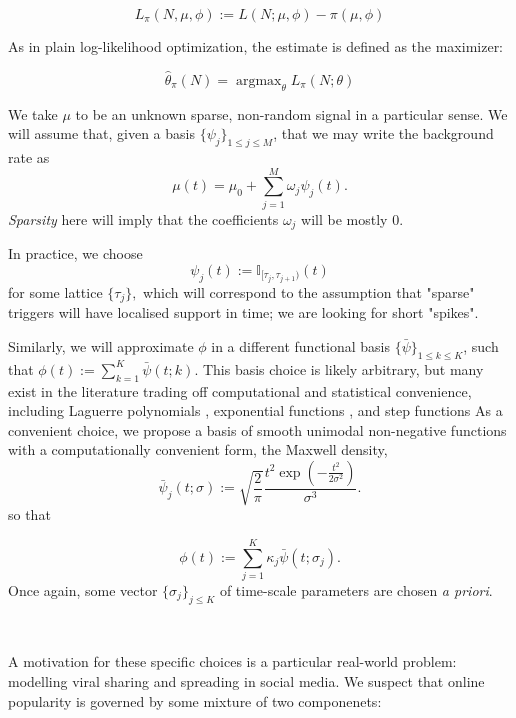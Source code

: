 \documentclass[11pt]{article}
\begin{document}
\[L_\pi(N, \mu, \phi):= L(N; \mu, \phi)- \pi(\mu, \phi)\]

As in plain log-likelihood optimization, the estimate is defined as the
maximizer:

\[\hat{\theta}_\pi(N) = \operatorname{argmax}_\theta L_\pi(N;\theta)\]

    We take \(\mu\) to be an unknown sparse, non-random signal in a
particular sense. We will assume that, given a basis
\(\{\psi_j \}_{1\leq j\leq M}\), that we may write the background rate
as \[\mu(t) = \mu_0 + \sum_{j=1}^M  \omega_j \psi_j(t).\]
\emph{Sparsity} here will imply that the coefficients \(\omega_j\) will
be mostly 0.

In practice, we choose
\[\psi_j(t) := \mathbb{I}_{[\tau_{j},\tau_{j+1})}(t)\] for some lattice
\(\{\tau_j\},\) which will correspond to the assumption that "sparse"
triggers will have localised support in time; we are looking for short
"spikes".

Similarly, we will approximate \(\phi\) in a different functional basis
\(\{\bar{\psi}\}_{1\leq k \leq K}\), such that
\(\phi(t):= \sum_{k=1}^K \bar{\psi}(t;k)\). This basis choice is likely
arbitrary, but many exist in the literature trading off computational
and statistical convenience, including Laguerre polynomials
\cite{ogata_linear_1982}, exponential functions
\cite{schoenberg_consistent_2005,rambaldi_modeling_2015}, and step
functions \cite{eichler_graphical_2016} As a convenient choice, we
propose a basis of smooth unimodal non-negative functions with a
computationally convenient form, the Maxwell density,
\[\bar{\psi}_j(t;\sigma):=\sqrt{\frac{2}{\pi}} \frac{t^2\exp\left(-\frac{t^2}{2\sigma^2}\right)}{\sigma^3}.\]
so that

\[\phi(t):= \sum_{j=1}^K \kappa_j\bar{\psi}(t;\sigma_j).\] Once again,
some vector \(\{\sigma_j\}_{j\leq K}\) of time-scale parameters are
chosen \emph{a priori}.



    \begin{center}
    \end{center}
    { \hspace*{\fill} \\}
    
    A motivation for these specific choices is a particular real-world
problem: modelling viral sharing and spreading in social media. We
suspect that online popularity is governed by some mixture of two
componenets:
\end{document}
